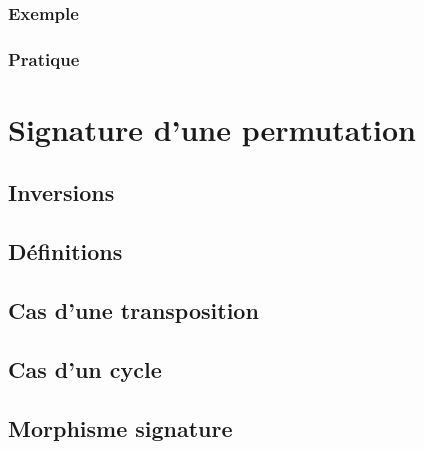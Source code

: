 \documentclass[12pt,a4paper,french]{book}
\begin{document}
			\subsubsection{Exemple}
			\subsubsection{Pratique}
	\section{Signature d'une permutation}
		\subsection{Inversions}
		\subsection{Définitions}
		\subsection{Cas d'une transposition}
		\subsection{Cas d'un cycle}
		\subsection{Morphisme signature}
			
\end{document}
